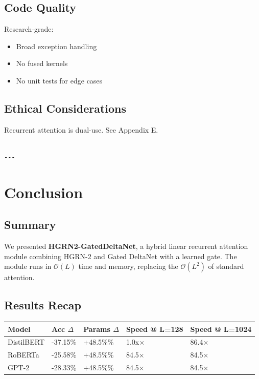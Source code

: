 \subsection{Code Quality}

Research-grade:
\begin{itemize}
\item Broad exception handling
\item No fused kernels
\item No unit tests for edge cases

\end{itemize}
\subsection{Ethical Considerations}

Recurrent attention is dual-use. See Appendix E.
\begin{lstlisting}

---
\end{lstlisting}

\section{Conclusion}

\subsection{Summary}

We presented \textbf{HGRN2-GatedDeltaNet}, a hybrid linear recurrent attention 
module combining HGRN-2 and Gated DeltaNet with a learned gate. The module 
runs in $\mathcal{O}(L)$ time and memory, replacing the $\mathcal{O}(L^2)$ 
of standard attention.

\subsection{Results Recap}

\begin{table}[H]
\centering
\small
\begin{tabular}{lllll}
\toprule
\textbf{Model} & \textbf{Acc $\Delta$} & \textbf{Params $\Delta$} & \textbf{Speed @ L=128} & \textbf{Speed @ L=1024} \\
\midrule
DistilBERT & -37.15\% & +48.5\%\% & 1.0x$\times$ & 86.4$\times$ \\
RoBERTa & -25.58\% & +48.5\%\% & 84.5$\times$ & 84.5$\times$ \\
GPT-2 & -28.33\% & +48.5\%\% & 84.5$\times$ & 84.5$\times$ \\
\bottomrule
\end{tabular}
\end{table}

